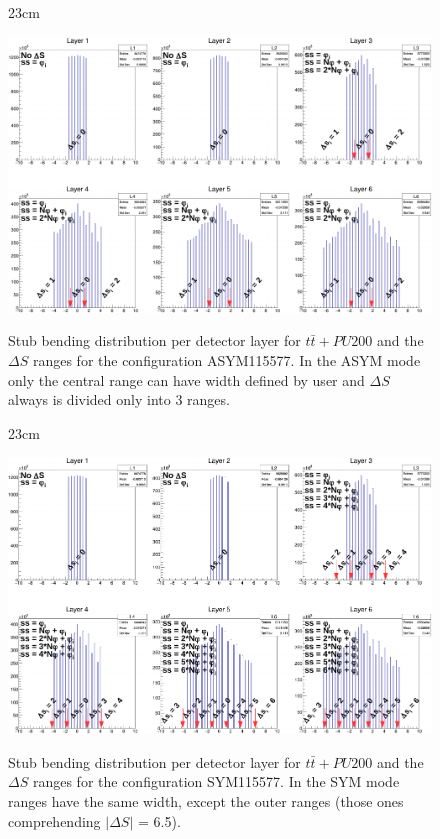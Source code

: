 \begin{landscape}
	\begin{figure}[htbp]{23cm}
		\caption{Stub bending distribution per detector layer for $t\bar{t}+PU200$ and the $\Delta S$ ranges for the configuration ASYM115577. In the ASYM mode only the central range can have width defined by user and $\Delta S$ always is divided only into 3 ranges.}
		\centering
		\includegraphics[scale=0.75]{AppendixCMSL1TT/figs/ttbar_pu200_asym115577}
		\label{fig:deltaS_ttbar_asym}
	\end{figure}
\end{landscape}

\begin{landscape}
	\begin{figure}[htbp]{23cm}
		\caption{Stub bending distribution per detector layer for $t\bar{t}+PU200$ and the $\Delta S$ ranges for the configuration SYM115577. In the SYM mode ranges have the same width, except the outer ranges (those ones comprehending $|\Delta S|$ = 6.5).}
		\centering
		\includegraphics[scale=0.75]{AppendixCMSL1TT/figs/ttbar_pu200_sym115577}
		\label{fig:deltaS_ttbar_sym}
	\end{figure}
\end{landscape}

